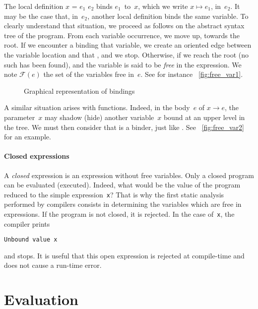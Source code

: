 The local definition \Xlet $x$ = $e_1$ \Xin $e_2$ binds $e_1$~to~$x$,
which we write $x \mapsto e_1$, in~$e_2$. It may be the case that,
in~\(e_2\), another local definition binds the same variable. To
clearly understand that situation, we proceed as follows on the
abstract syntax tree of the program. From each variable occurrence, we
move up, towards the root. If we encounter a \Xlet binding that
variable, we create an oriented edge between the variable location and
that \Xlet, and we stop. Otherwise, if we reach the root (no such
\Xlet has been found), and the variable is said to be \emph{free} in the
expression. We note \(\mathcal{F}(e)\) the set of the variables free
in~\(e\). See for instance \fig~\vref{fig:free_var1}.
\begin{figure}
\centering
{}
\qquad\qquad
{}
\caption{Graphical representation of bindings}
\end{figure}
A similar situation arises with functions. Indeed, in the body~\(e\)
of \Xfun $x \rightarrow e$, the parameter~\(x\) may shadow (hide)
another variable~\(x\) bound at an upper level in the tree. We must
then consider that \Xfun is a binder, just like \Xlet. See
\fig~\vref{fig:free_var2} for an example.

\paragraph{Closed expressions}

A \emph{closed} expression is an expression without free
variables. Only a closed program can be evaluated (executed). Indeed,
what would be the value of the program reduced to the simple
expression~\texttt{x}? That is why the first static analysis performed
by compilers consists in determining the variables which are free in
expressions. If the program is not closed, it is rejected. In the case
of~\texttt{x}, the \OCaml compiler prints
\begin{center}
\texttt{Unbound value x}
\end{center}
and stops. It is useful that this open expression is rejected at
compile\hyp{}time and does not cause a run\hyp{}time error.

\section{Evaluation}

